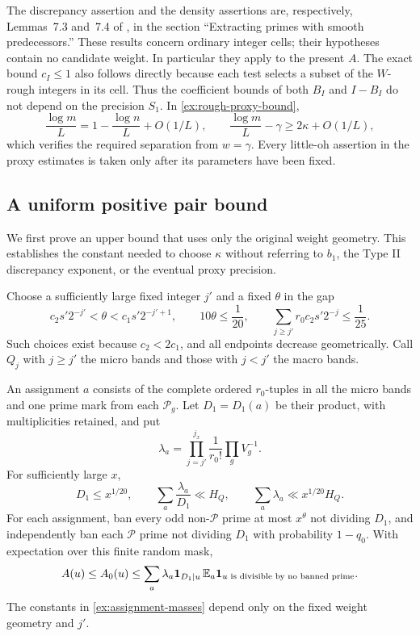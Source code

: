 The discrepancy assertion and the density assertions are,
respectively, Lemmas~7.3 and~7.4 of \cite{SmoothShifted}, in the
section ``Extracting primes with smooth predecessors.'' These
results concern ordinary integer cells; their hypotheses contain
no candidate weight. In particular they apply to the present $A$.
The exact bound $c_I\le1$ also follows directly because each test
selects a subset of the $W$-rough integers in its cell. Thus the
coefficient bounds of both $B_I$ and $I-B_I$ do not depend on the
precision $S_1$. In \eqref{ex:rough-proxy-bound},
\[
 \frac{\log m}{L}=1-\frac{\log n}{L}+O(1/L),\qquad
 \frac{\log m}{L}-\gamma\ge2\kappa+O(1/L),
\]
which verifies the required separation from $w=\gamma$. Every
little-oh assertion in the proxy estimates is taken only after its
parameters have been fixed.

\subsection{A uniform positive pair bound}

We first prove an upper bound that uses only the original weight
geometry. This establishes the constant needed to choose $\kappa$
without referring to $b_1$, the Type II discrepancy exponent, or
the eventual proxy precision.

Choose a sufficiently large fixed integer $j'$ and a fixed $\theta$
in the gap
\begin{equation}\label{ex:micro-choice}
 c_2s'2^{-j'}<\theta<c_1s'2^{-j'+1},\qquad
 10\theta\le\frac1{20},\qquad
 \sum_{j\ge j'}r_0c_2s'2^{-j}\le\frac1{25}.
\end{equation}
Such choices exist because $c_2<2c_1$, and all endpoints decrease
geometrically. Call $Q_j$ with $j\ge j'$ the micro bands and those
with $j<j'$ the macro bands.

\begin{lemma}\label{ex:mask}
An assignment $a$ consists of the complete ordered $r_0$-tuples in
all the micro bands and one prime mark from each $\mathcal P_g$.
Let $D_1=D_1(a)$ be their product, with multiplicities retained, and
put
\[
 \lambda_a=\prod_{j=j'}^{j_x}\frac1{r_0!}\prod_g V_g^{-1}.
\]
For sufficiently large $x$,
\begin{equation}\label{ex:assignment-masses}
 D_1\le x^{1/20},\qquad
 \sum_a\frac{\lambda_a}{D_1}\ll H_Q,\qquad
 \sum_a\lambda_a\ll x^{1/20}H_Q.
\end{equation}
For each assignment, ban every odd non-$\mathcal P$ prime at most
$x^\theta$ not dividing $D_1$, and independently ban each
$\mathcal P$ prime not dividing $D_1$ with probability $1-q_0$.
With expectation over this finite random mask,
\begin{equation}\label{ex:positive-majorant}
 A(u)\le A_0(u)\le
 \sum_a\lambda_a\mathbf{1}_{D_1\mid u}\,\mathbb E_a
           \mathbf{1}_{u\text{ is divisible by no banned prime}}.
\end{equation}
The constants in \eqref{ex:assignment-masses} depend only on the
fixed weight geometry and $j'$.
\end{lemma}


